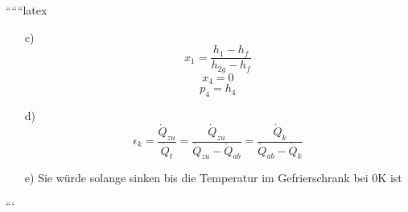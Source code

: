 ``````latex


\begin{itemize}
    \item[c)] 
    \[
    x_1 = \frac{h_1 - h_f}{h_{2g} - h_f}
    \]
    \[
    x_4 = 0
    \]
    \[
    p_4 = h_4
    \]
    
    \item[d)] 
    \[
    \epsilon_{k} = \frac{\dot{Q}_{zu}}{\dot{Q}_{t}} = \frac{\dot{Q}_{zu}}{\dot{Q}_{zu} - \dot{Q}_{ab}} = \frac{\dot{Q}_{k}}{\dot{Q}_{ab} - \dot{Q}_{k}}
    \]
    
    \item[e)] 
    Sie würde solange sinken bis die Temperatur im Gefrierschrank bei 0K ist
\end{itemize}

```